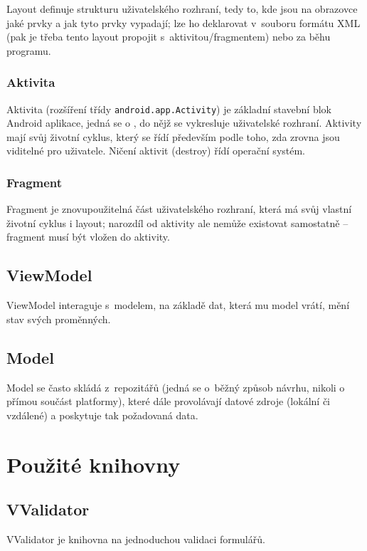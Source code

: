 \documentclass[twoside]{ctuthesis}
\begin{document}
Layout definuje strukturu uživatelského rozhraní, tedy to, kde jsou na obrazovce jaké prvky a jak tyto prvky vypadají; lze ho deklarovat v~souboru formátu XML (pak je třeba tento layout propojit s~aktivitou/fragmentem) nebo za běhu programu. \cite{android2020layouts}

\subsubsection{Aktivita}

Aktivita (rozšíření třídy \texttt{android.app.Activity}) je základní stavební blok Android aplikace, jedná se o , do nějž se vykresluje uživatelské rozhraní. Aktivity mají svůj životní cyklus, který se řídí především podle toho, zda zrovna jsou viditelné pro uživatele. Ničení aktivit (destroy) řídí operační systém. \cite{android2020activity}

\subsubsection{Fragment}

Fragment je znovupoužitelná část uživatelského rozhraní, která má svůj vlastní životní cyklus i layout; narozdíl od aktivity ale nemůže existovat samostatně -- fragment musí být vložen do aktivity. \cite{android2020fragments}

\subsection{ViewModel}

ViewModel interaguje s~modelem, na základě dat, která mu model vrátí, mění stav svých proměnných.

\subsection{Model}

Model se často skládá z~repozitářů (jedná se o~běžný způsob návrhu, nikoli o přímou součást platformy), které dále provolávají datové zdroje (lokální či vzdálené) a poskytuje tak požadovaná data.

\newpage
\section{Použité knihovny}

\subsection{VValidator}
VValidator \cite{follestad2021vvalidator} je knihovna na jednoduchou validaci formulářů.
\end{document}
